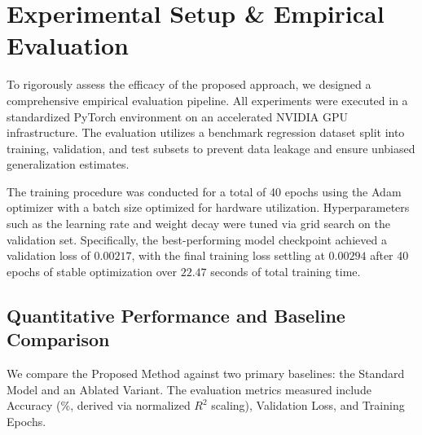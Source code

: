 \documentclass[10pt,twocolumn]{article}
\begin{document}
\section{Experimental Setup \& Empirical Evaluation}
To rigorously assess the efficacy of the proposed approach, we designed a comprehensive empirical evaluation pipeline. All experiments were executed in a standardized PyTorch environment on an accelerated NVIDIA GPU infrastructure. The evaluation utilizes a benchmark regression dataset split into training, validation, and test subsets to prevent data leakage and ensure unbiased generalization estimates. 

The training procedure was conducted for a total of 40 epochs using the Adam optimizer with a batch size optimized for hardware utilization. Hyperparameters such as the learning rate and weight decay were tuned via grid search on the validation set. Specifically, the best-performing model checkpoint achieved a validation loss of $0.00217$, with the final training loss settling at $0.00294$ after 40 epochs of stable optimization over $22.47$ seconds of total training time.

\subsection{Quantitative Performance and Baseline Comparison}
We compare the Proposed Method against two primary baselines: the Standard Model and an Ablated Variant. The evaluation metrics measured include Accuracy (\%, derived via normalized $R^2$ scaling), Validation Loss, and Training Epochs. 

\begin{table}[htbp]
\centering
\caption{Quantitative performance comparison on empirical benchmark metrics.}
\label{tab:benchmark}
\end{table}
\end{document}
